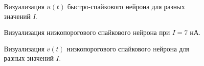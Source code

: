 \begin{figure}[h]
	\caption{Визуализация $u(t)$ быстро-спайкового нейрона для разных значений $I$.}
	\label{fs_different_I_recovery}
\end{figure}

\begin{figure}[h]
\caption{Визуализация низкопорогового спайкового нейрона при $I=7$ нА.}
\label{1_lts}
\end{figure}

\begin{figure}[h]
	\caption{Визуализация $v(t)$ низкопорогового спайкового нейрона для разных значений $I$.}
	\label{lts_different_I_potentials}
\end{figure}

